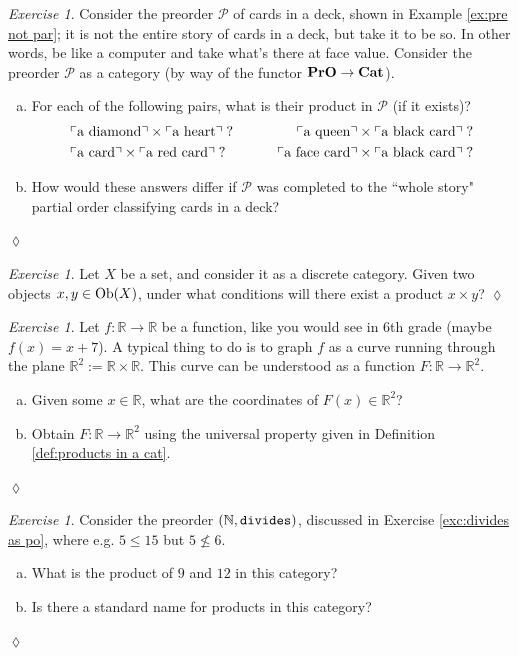 \documentclass{book}
\def\tn{\textnormal}
\def\mc{\mathcal}
\def\RR{{\mathbb R}}
\def\NN{{\mathbb N}}
\def\Ob{\tn{Ob}}
\def\hsp{\hspace{.3in}}
\def\to{\rightarrow}
\def\taking{\colon}
\newcommand{\fakebox}[1]{\tn{$\ulcorner$#1$\urcorner$}}
\def\Cat{{\bf Cat}}
\def\PrO{{\bf PrO}}
\def\mcP{\mc{P}}
\theoremstyle{remark}
\newtheorem{exc}[subsubsection]{Exercise}
\newenvironment{exercise}{\begin{exc}}{\hspace*{\fill}$\lozenge$\end{exc}}
\theoremstyle{definition}
\def\sexc{\begin{enumerate}[a.)]\setlength{\itemsep}{.1cm}\setlength{\parskip}{.1cm}\item}
\def\next{\item}
\def\endsexc{\end{enumerate}}
\begin{document}
\begin{exercise}
Consider the preorder $\mcP$ of cards in a deck, shown in Example \ref{ex:pre not par}; it is not the entire story of cards in a deck, but take it to be so. In other words, be like a computer and take what's there at face value. Consider the preorder $\mcP$ as a category (by way of the functor $\PrO\to\Cat$\index{a functor!$\PrO\to\Cat$}).
\sexc For each of the following pairs, what is their product in $\mcP$ (if it exists)?
\begin{align*}
&\fakebox{a diamond}\times\fakebox{a heart}\;? \hsp &\fakebox{a queen}\times\fakebox{a black card}\;?\\
& \fakebox{a card}\times\fakebox{a red card}\;?\hsp&\fakebox{a face card}\times\fakebox{a black card}\;?
\end{align*}
\next How would these answers differ if $\mcP$ was completed to the ``whole story" partial order classifying cards in a deck?
\endsexc
\end{exercise}

\begin{exercise}
Let $X$ be a set, and consider it as a discrete category. Given two objects $x,y\in\Ob(X)$, under what conditions will there exist a product $x\times y$?
\end{exercise}

\begin{exercise}
Let $f\taking\RR\to\RR$ be a function, like you would see in 6th grade (maybe $f(x)=x+7$). A typical thing to do is to graph $f$ as a curve running through the plane $\RR^2:=\RR\times\RR$. This curve can be understood as a function $F\taking\RR\to\RR^2$.
\sexc Given some $x\in\RR$, what are the coordinates of $F(x)\in\RR^2$? 
\next Obtain $F\taking\RR\to\RR^2$ using the universal property given in Definition \ref{def:products in a cat}. 
\endsexc
\end{exercise}

\begin{exercise}
Consider the preorder $(\NN,{\tt divides})$, discussed in Exercise \ref{exc:divides as po}, where e.g. $5\leq 15$ but $5\not\leq 6$. \sexc What is the product of $9$ and $12$ in this category?
\next Is there a standard name for products in this category?
\endsexc
\end{exercise}
\end{document}
